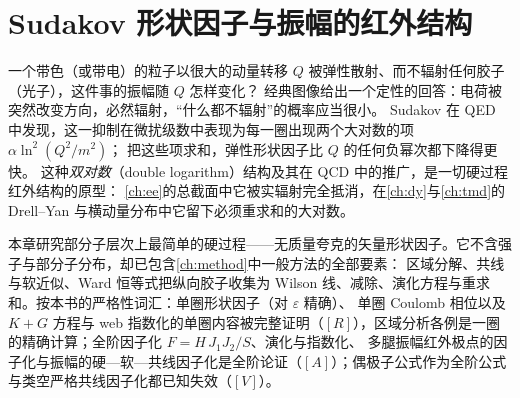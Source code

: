 \chapter{Sudakov 形状因子与振幅的红外结构}\label{ch:sudakov}

一个带色（或带电）的粒子以很大的动量转移 $Q$ 被弹性散射、而不辐射任何胶子（光子），这件事的振幅随 $Q$ 怎样变化？
经典图像给出一个定性的回答：电荷被突然改变方向，必然辐射，“什么都不辐射”的概率应当很小。
Sudakov 在 QED 中发现\cite{Sudakov1956}，这一抑制在微扰级数中表现为每一圈出现两个大对数的项 $\alpha\ln^2(Q^2/m^2)$；
把这些项求和，弹性形状因子比 $Q$ 的任何负幂次都下降得更快。
这种\emph{双对数}（double logarithm）结构及其在 QCD 中的推广，是一切硬过程红外结构的原型：
\cref{ch:ee}的总截面中它被实辐射完全抵消，在\cref{ch:dy}与\cref{ch:tmd}的 Drell--Yan 与横动量分布中它留下必须重求和的大对数。

本章研究部分子层次上最简单的硬过程——无质量夸克的矢量形状因子。它不含强子与部分子分布，却已包含\cref{ch:method}中一般方法的全部要素：
区域分解、共线与软近似、Ward 恒等式把纵向胶子收集为 Wilson 线、减除、演化方程与重求和。按本书的严格性词汇：单圈形状因子（对 $\varepsilon$ 精确）、
单圈 Coulomb 相位以及 $K+G$ 方程与 web 指数化的单圈内容被完整证明（$[R]$），区域分析各例是一圈的精确计算；全阶因子化 $F=H\,J_1J_2/S$、演化与指数化、
多腿振幅红外极点的因子化与振幅的硬—软—共线因子化是全阶论证（$[A]$）；偶极子公式作为全阶公式与类空严格共线因子化都已知失效（$[V]$）。

